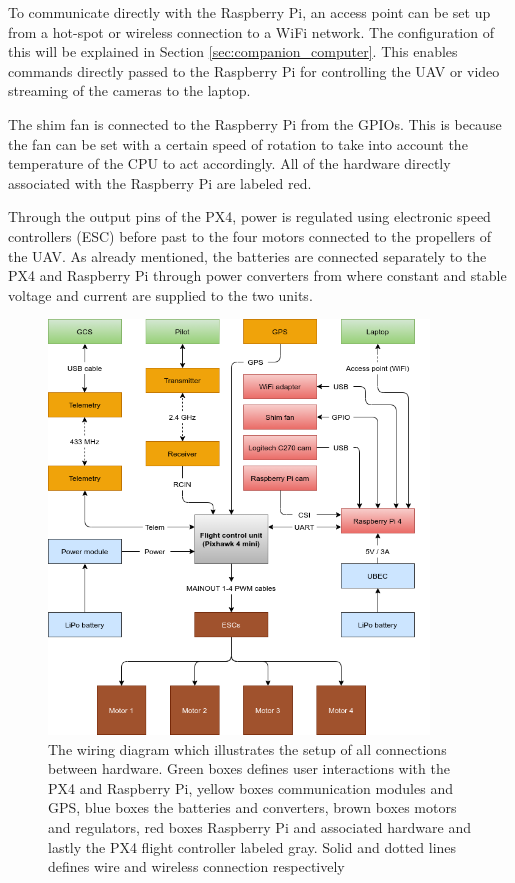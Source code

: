 \documentclass[../Head/report.tex]{subfiles}
\begin{document}
To communicate directly with the Raspberry Pi, an access point can be set up from a hot-spot or wireless connection to a WiFi network. The configuration of this will be explained in Section \ref{sec:companion_computer}. This enables commands directly passed to the Raspberry Pi for controlling the UAV or video streaming of the cameras to the laptop.

The shim fan is connected to the Raspberry Pi from the GPIOs. This is because the fan can be set with a certain speed of rotation to take into account the temperature of the CPU to act accordingly. All of the hardware directly associated with the Raspberry Pi are labeled red.  

Through the output pins of the PX4, power is regulated using electronic speed controllers (ESC) before past to the four motors connected to the propellers of the UAV. As already mentioned, the batteries are connected separately to the PX4 and Raspberry Pi through power converters from where constant and stable voltage and current are supplied to the two units.   

\begin{figure}[H]
    \centering
     \includegraphics[height=11.0cm]{../Figures/power_system/power_system.png}
    \caption{The wiring diagram which illustrates the setup of all connections between hardware. Green boxes defines user interactions with the PX4 and Raspberry Pi, yellow boxes communication modules and GPS, blue boxes the batteries and converters, brown boxes motors and regulators, red boxes Raspberry Pi and associated hardware and lastly the PX4 flight controller labeled gray. Solid and dotted lines defines wire and wireless connection respectively}
    \label{fig:wiring_diagram}
\end{figure}
\end{document}
